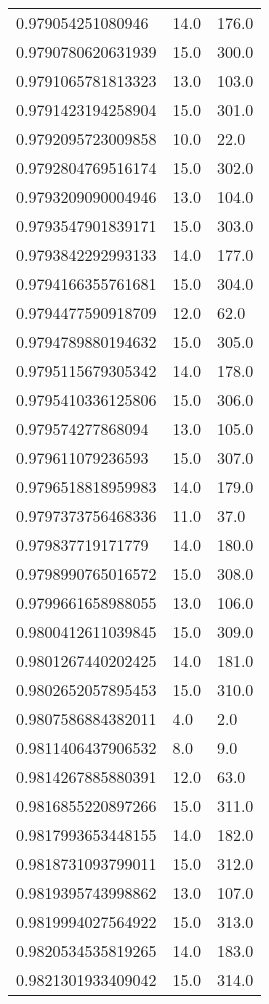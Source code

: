 \begin{center}
\begin{supertabular}[H]{p{0.30\textwidth}p{0.05\textwidth}p{0.05\textwidth}}
0.979054251080946 & 14.0 & 176.0 \\ 
0.9790780620631939 & 15.0 & 300.0 \\ 
0.9791065781813323 & 13.0 & 103.0 \\ 
0.9791423194258904 & 15.0 & 301.0 \\ 
0.9792095723009858 & 10.0 & 22.0 \\ 
0.9792804769516174 & 15.0 & 302.0 \\ 
0.9793209090004946 & 13.0 & 104.0 \\ 
0.9793547901839171 & 15.0 & 303.0 \\ 
0.9793842292993133 & 14.0 & 177.0 \\ 
0.9794166355761681 & 15.0 & 304.0 \\ 
0.9794477590918709 & 12.0 & 62.0 \\ 
0.9794789880194632 & 15.0 & 305.0 \\ 
0.9795115679305342 & 14.0 & 178.0 \\ 
0.9795410336125806 & 15.0 & 306.0 \\ 
0.979574277868094 & 13.0 & 105.0 \\ 
0.979611079236593 & 15.0 & 307.0 \\ 
0.9796518818959983 & 14.0 & 179.0 \\ 
0.9797373756468336 & 11.0 & 37.0 \\ 
0.979837719171779 & 14.0 & 180.0 \\ 
0.9798990765016572 & 15.0 & 308.0 \\ 
0.9799661658988055 & 13.0 & 106.0 \\ 
0.9800412611039845 & 15.0 & 309.0 \\ 
0.9801267440202425 & 14.0 & 181.0 \\ 
0.9802652057895453 & 15.0 & 310.0 \\ 
0.9807586884382011 & 4.0 & 2.0 \\ 
0.9811406437906532 & 8.0 & 9.0 \\ 
0.9814267885880391 & 12.0 & 63.0 \\ 
0.9816855220897266 & 15.0 & 311.0 \\ 
0.9817993653448155 & 14.0 & 182.0 \\ 
0.9818731093799011 & 15.0 & 312.0 \\ 
0.9819395743998862 & 13.0 & 107.0 \\ 
0.9819994027564922 & 15.0 & 313.0 \\ 
0.9820534535819265 & 14.0 & 183.0 \\ 
0.9821301933409042 & 15.0 & 314.0 \\ 

\end{supertabular}
\end{center}
